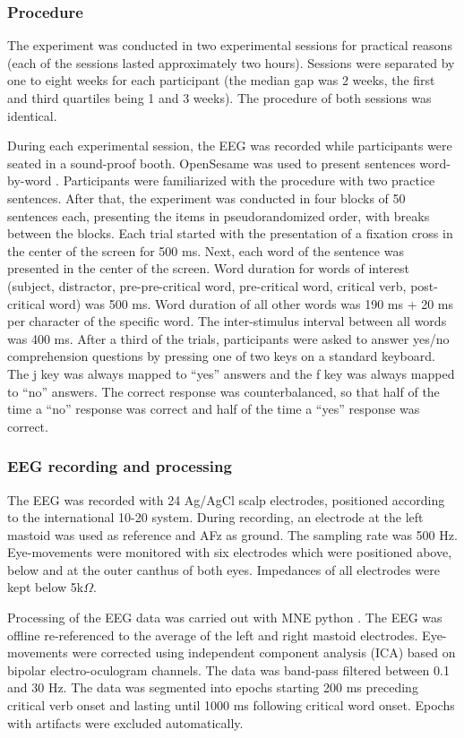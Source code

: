 \documentclass[a4paper, man, floatsintext]{apa7}
\begin{document}
\subsubsection{Procedure}
The experiment was conducted in two experimental sessions for practical reasons (each of the sessions lasted approximately two hours). Sessions were separated by one to eight weeks for each participant (the median gap was 2 weeks, the first and third quartiles being 1 and 3 weeks). The procedure of both sessions was identical.

During each experimental session, the EEG was recorded while participants were
seated in a sound-proof booth. OpenSesame was used to present sentences word-by-word \citep{opensesame}. Participants were familiarized with the procedure with two practice sentences. After that, the experiment was conducted in four blocks of 50 sentences each, presenting the items in pseudorandomized order, with breaks between the blocks. Each trial started with the presentation of a fixation cross in the center of the screen for 500 ms. Next, each word of the sentence was presented in the center of the screen. Word duration for words of interest (subject, distractor, pre-pre-critical word, pre-critical word, critical verb, post-critical word) was 500 ms. Word duration of all other words was 190 ms + 20 ms per character of the specific word. The inter-stimulus interval between all words was 400 ms. After a third of the trials, participants were asked to answer yes/no comprehension questions by pressing one of two keys on a standard keyboard. The j key was always mapped to ``yes'' answers and the f key was always mapped to ``no'' answers. The correct response was counterbalanced, so that half of the time a ``no'' response was correct and half of the time a ``yes'' response was correct. 

\subsubsection{EEG recording and processing}
The EEG was recorded with 24 Ag/AgCl scalp electrodes, positioned according to the international 10-20 system. During recording, an electrode at the left mastoid was used as reference and AFz as ground. The sampling rate was 500 Hz. Eye-movements were monitored with six electrodes which were positioned above, below and at the outer canthus of both eyes. Impedances of all electrodes were kept below 5k$\Omega$.

Processing of the EEG data was carried out with MNE python \citep{mne}. The EEG was offline re-referenced to the average of the left and right mastoid electrodes. Eye-movements were corrected using independent component analysis (ICA) based on bipolar electro-oculogram channels. The data was band-pass filtered between 0.1 and 30 Hz. The data was segmented into epochs starting 200 ms preceding critical verb onset and lasting until 1000 ms following critical word onset. Epochs with artifacts were excluded automatically.
\end{document}
